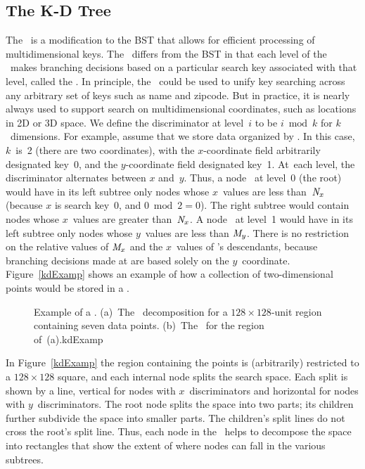 \subsection{The K-D Tree}

The \KDtree\ is a modification to the BST that allows for efficient
processing of multidimensional keys.
The \KDtree\ differs from the BST in that each level of the \KDtree\
makes branching decisions based on a particular search key associated
with that level, called the \defit{discriminator}.
In principle, the \KDtree\ could be used to unify key searching across
any arbitrary set of keys such as name and zipcode.
But in practice, it is nearly always used to support search on
multidimensional coordinates, such as locations in 2D or 3D space.
We define the discriminator at level~$i$ to be $i \bmod k$ for
$k$~dimensions.
For example, assume that we store data organized by \XYcoords.
In this case, $k$~is~2 (there are two coordinates), with the
$x$-coordinate field arbitrarily designated key~0, and the
$y$-coordinate field designated key~1.
At~each level, the discriminator alternates between $x$ and~$y$.
Thus, a node~\svar{N} at level~0 (the root) would have in its left
subtree only nodes whose $x$~values are less than~${\textit{N}}_x$
(because $x$ is search key~0, and $0 \bmod 2 = 0$).
The right subtree would contain nodes whose $x$~values are greater
than~${\textit{N}}_x$.
A node~ at level~1 would have in its left subtree only nodes
whose $y$~values are less than $_y$.
There is no restriction on the relative values of ${\textit{M}}_x$ and the
$x$~values of 's descendants, because branching decisions made
at \svar{M} are based solely on the $y$~coordinate.
Figure~\ref{kdExamp} shows an example of how a collection of
two-dimensional points would be stored in a \KDtree.

\begin{figure}
\vspace{-\bigskipamount}\vspace{-\smallskipamount}
{Example of a \KDtree.
(a)~The \KDtree\ decomposition for a $128 \times 128$-unit region
containing seven data points.
(b)~The \KDtree\ for the region of~(a).}{kdExamp}
\smallskip
\end{figure}

In Figure~\ref{kdExamp} the region containing the points
is (arbitrarily) restricted to a $128 \times 128$ square, and
each internal node splits the search space.
Each split is shown by a line, vertical for nodes with
$x$~discriminators and horizontal for nodes with $y$~discriminators.
The root node splits the space into two parts;
its children further subdivide the space into smaller parts.
The children's split lines do not cross the root's split line.
Thus, each node in the \KDtree\ helps to decompose the space into
rectangles that show the extent of where nodes can fall in the
various subtrees.

